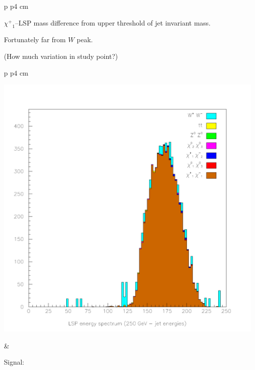 \documentclass[landscape]{article}
\begin{document}
\begin{center}
\begin{tabular}{p{\textheight} p{4 cm}}
\begin{minipage}{\linewidth}
      \vspace{1 cm}
      $\mbox{$\chi^+$}_1$--LSP mass difference from upper threshold of
      jet invariant mass.

      \vspace{1 cm}
      Fortunately far from $W$ peak.

      \vspace{1 cm}
      (How much variation in study point?)
    \end{minipage}
  \end{tabular}
\end{center}
\pagebreak

\begin{center} \begin{tabular}{p{\textheight} p{4 cm}}
    \begin{minipage}{\linewidth}
      \includegraphics[width=\linewidth]{charginos_5.pdf}
    \end{minipage} &
    \begin{minipage}{\linewidth}
      Signal: \\

\end{minipage}
\end{tabular}
\end{center}
\end{document}
